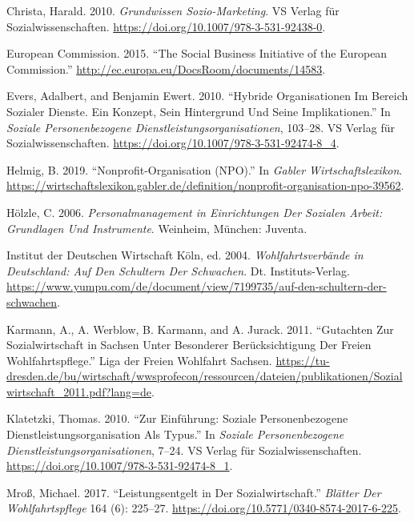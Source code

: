 \documentclass[
  letterpaper,
]{book}
\newlength{\cslhangindent}
\newenvironment{CSLReferences}[2] %
 {\begin{list}{}{%
  \setlength{\itemindent}{0pt}
  \setlength{\leftmargin}{0pt}
  \setlength{\parsep}{0pt}
  \ifodd #1
   \setlength{\leftmargin}{\cslhangindent}
   \setlength{\itemindent}{-1\cslhangindent}
  \fi
  \setlength{\itemsep}{#2\baselineskip}}}
 {\end{list}}
\begin{document}
\begin{CSLReferences}{1}{0}
Christa, Harald. 2010. \emph{Grundwissen Sozio-Marketing}. VS Verlag für
Sozialwissenschaften. \url{https://doi.org/10.1007/978-3-531-92438-0}.

European Commission. 2015. {``The Social Business Initiative of the
European Commission.''}
\url{http://ec.europa.eu/DocsRoom/documents/14583}.

Evers, Adalbert, and Benjamin Ewert. 2010. {``Hybride Organisationen Im
Bereich Sozialer Dienste. Ein Konzept, Sein Hintergrund Und Seine
Implikationen.''} In \emph{Soziale Personenbezogene
Dienstleistungsorganisationen}, 103--28. VS Verlag für
Sozialwissenschaften. \url{https://doi.org/10.1007/978-3-531-92474-8_4}.

Helmig, B. 2019. {``Nonprofit-Organisation (NPO).''} In \emph{Gabler
Wirtschaftslexikon}.
\url{https://wirtschaftslexikon.gabler.de/definition/nonprofit-organisation-npo-39562}.

Hölzle, C. 2006. \emph{Personalmanagement in Einrichtungen Der Sozialen
Arbeit: Grundlagen Und Instrumente}. Weinheim, München: Juventa.

Institut der Deutschen Wirtschaft Köln, ed. 2004.
\emph{Wohlfahrtsverbände in Deutschland: Auf Den Schultern Der
Schwachen}. Dt. Instituts-Verlag.
\url{https://www.yumpu.com/de/document/view/7199735/auf-den-schultern-der-schwachen}.

Karmann, A., A. Werblow, B. Karmann, and A. Jurack. 2011. {``Gutachten
Zur Sozialwirtschaft in Sachsen Unter Besonderer Berücksichtigung Der
Freien Wohlfahrtspflege.''} Liga der Freien Wohlfahrt Sachsen.
\url{https://tu-dresden.de/bu/wirtschaft/wwsprofecon/ressourcen/dateien/publikationen/Sozialwirtschaft_2011.pdf?lang=de}.

Klatetzki, Thomas. 2010. {``Zur Einführung: Soziale Personenbezogene
Dienstleistungsorganisation Als Typus.''} In \emph{Soziale
Personenbezogene Dienstleistungsorganisationen}, 7--24. VS Verlag für
Sozialwissenschaften. \url{https://doi.org/10.1007/978-3-531-92474-8_1}.

Mroß, Michael. 2017. {``Leistungsentgelt in Der Sozialwirtschaft.''}
\emph{Blätter Der Wohlfahrtspflege} 164 (6): 225--27.
\url{https://doi.org/10.5771/0340-8574-2017-6-225}.


\end{CSLReferences}
\end{document}
